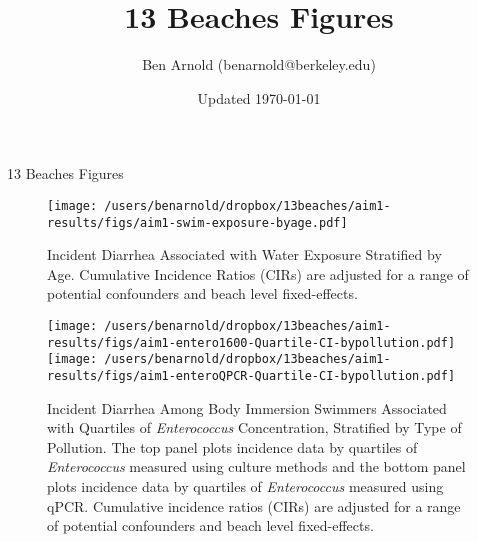 \documentclass[11pt]{article}
\title{13 Beaches Figures}
\author{Ben Arnold (benarnold@berkeley.edu)}
\date{Updated \today}
\begin{document}
{\centerline {\LARGE 13 Beaches Figures} }


\begin{landscape}
\begin{figure}[htbp]
\begin{center}
\texttt{[image: /users/benarnold/dropbox/13beaches/aim1-results/figs/aim1-swim-exposure-byage.pdf]}
\begin{minipage}{1.2\textwidth}
\caption{Incident Diarrhea Associated with Water Exposure Stratified by Age. Cumulative Incidence Ratios (CIRs) are adjusted for a range of potential confounders and beach level fixed-effects.}
\label{fig:swimex}
\end{minipage}
\end{center}
\end{figure}
\end{landscape}

\begin{figure}[htbp]
\begin{center}
\texttt{[image: /users/benarnold/dropbox/13beaches/aim1-results/figs/aim1-entero1600-Quartile-CI-bypollution.pdf]} 
\texttt{[image: /users/benarnold/dropbox/13beaches/aim1-results/figs/aim1-enteroQPCR-Quartile-CI-bypollution.pdf]} 
\begin{minipage}{0.9\textwidth}
\caption{Incident Diarrhea Among Body Immersion Swimmers Associated with Quartiles of \textit{Enterococcus} Concentration, Stratified by Type of Pollution. The top panel plots incidence data by quartiles of \textit{Enterococcus} measured using culture methods and the bottom panel plots incidence data by quartiles of \textit{Enterococcus} measured using qPCR.  Cumulative incidence ratios (CIRs) are adjusted for a range of potential confounders and beach level fixed-effects. }
\label{fig:enteroquartile}
\end{minipage}
\end{center}
\end{figure}
\end{document}
